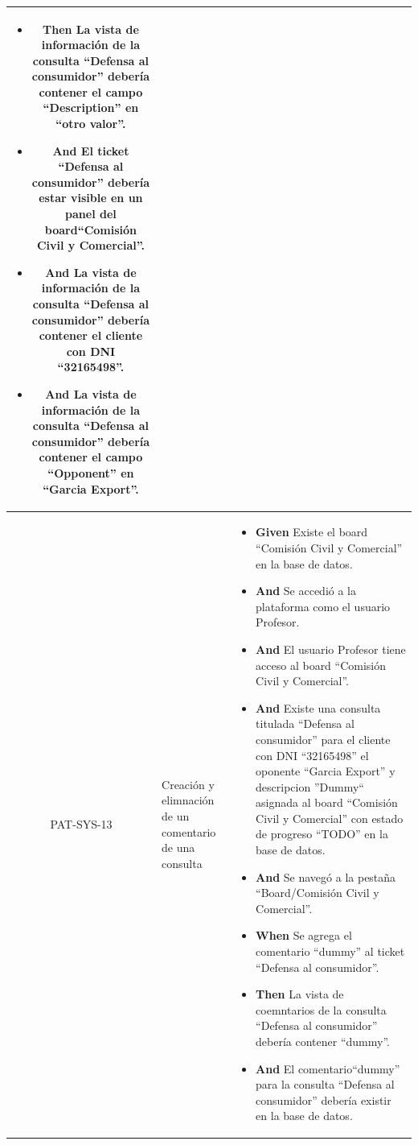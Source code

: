 \begin{longtable}{|c|p{2.5cm}|p{10.5cm}|}
\begin{itemize}
        \item \textbf{Then} La vista de información de la consulta ``Defensa al consumidor'' debería contener el campo ``Description'' en ``otro valor''.
        \item \textbf{And} El ticket ``Defensa al consumidor'' debería estar visible en un panel del board``Comisión Civil y Comercial''.
        \item \textbf{And} La vista de información de la consulta ``Defensa al consumidor'' debería contener el cliente con DNI ``32165498''.
        \item \textbf{And} La vista de información de la consulta ``Defensa al consumidor'' debería contener el campo ``Opponent'' en ``Garcia Export''.
    \end{itemize}
    \\ 
    \hline
     PAT-SYS-13 & Creación y elimnación de un comentario de una consulta & 
        \begin{itemize}
        \item \textbf{Given} Existe el board ``Comisión Civil y Comercial'' en la base de datos.
        \item \textbf{And} Se accedió a la plataforma como el usuario Profesor.
        \item \textbf{And} El usuario Profesor tiene acceso al board ``Comisión Civil y Comercial''.
        \item \textbf{And} Existe una consulta titulada ``Defensa al consumidor'' para el cliente con DNI ``32165498'' el oponente ``Garcia Export'' y descripcion ''Dummy`` asignada al board ``Comisión Civil y Comercial'' con estado de progreso ``TODO'' en la base de datos.
        \item \textbf{And} Se navegó a la pestaña ``Board/Comisión Civil y Comercial''.
        \newline
    
        \item \textbf{When} Se agrega el comentario ``dummy''  al ticket ``Defensa al consumidor''.
        \newline
    
        \item \textbf{Then} La vista de coemntarios de la consulta ``Defensa al consumidor'' debería contener ``dummy''.
        \item \textbf{And} El comentario``dummy'' para la consulta ``Defensa al consumidor'' debería existir en la base de datos.
        \newline


\end{itemize}
\end{longtable}
